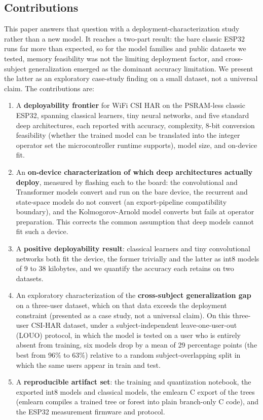 \documentclass{ieeeaccess}
\begin{document}
\subsection{Contributions}
\label{sec:contributions}
This paper answers that question with a deployment-characterization study rather than a new model. It reaches a two-part result: the bare classic ESP32 runs far more than expected, so for the model families and public datasets we tested, memory feasibility was not the limiting deployment factor, and cross-subject generalization emerged as the dominant accuracy limitation. We present the latter as an exploratory case-study finding on a small dataset, not a universal claim. The contributions are:
\begin{enumerate}
    \item A \textbf{deployability frontier} for WiFi CSI HAR on the PSRAM-less classic ESP32, spanning classical learners, tiny neural networks, and five standard deep architectures, each reported with accuracy, complexity, 8-bit conversion feasibility (whether the trained model can be translated into the integer operator set the microcontroller runtime supports), model size, and on-device fit.
    \item An \textbf{on-device characterization of which deep architectures actually deploy}, measured by flashing each to the board: the convolutional and Transformer models convert and run on the bare device, the recurrent and state-space models do not convert (an export-pipeline compatibility boundary), and the Kolmogorov-Arnold model converts but fails at operator preparation. This corrects the common assumption that deep models cannot fit such a device.
    \item A \textbf{positive deployability result}: classical learners and tiny convolutional networks both fit the device, the former trivially and the latter as int8 models of 9 to 38 kilobytes, and we quantify the accuracy each retains on two datasets.
    \item An exploratory characterization of the \textbf{cross-subject generalization gap} on a three-user dataset, which on that data exceeds the deployment constraint (presented as a case study, not a universal claim). On this three-user CSI-HAR dataset, under a subject-independent leave-one-user-out (LOUO) protocol, in which the model is tested on a user who is entirely absent from training, six models drop by a mean of 29 percentage points (the best from 96\% to 63\%) relative to a random subject-overlapping split in which the same users appear in train and test.
    \item A \textbf{reproducible artifact set}: the training and quantization notebook, the exported int8 models and classical models, the emlearn C export of the trees (emlearn compiles a trained tree or forest into plain branch-only C code), and the ESP32 measurement firmware and protocol.
\end{enumerate}
\end{document}

